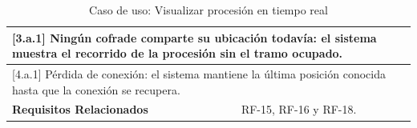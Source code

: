 \begin{table}[h!]
\begin{tabular}{|p{4cm}|p{11cm}|}
        \hline
        \multicolumn{2}{|p{15cm}|}{ [3.a.1] Ningún cofrade comparte su ubicación todavía: el sistema muestra el recorrido de la procesión sin el tramo ocupado. } \\
        \hline
        \multicolumn{2}{|p{15cm}|}{ [4.a.1] Pérdida de conexión: el sistema mantiene la última posición conocida hasta que la conexión se recupera. } \\
        \hline
        \textbf{Requisitos Relacionados} & RF-15, RF-16 y RF-18. \\
        \hline
    \end{tabular}
    \caption{Caso de uso: Visualizar procesión en tiempo real}
\end{table}

\begin{table}[h!]
    \centering
    \renewcommand{\arraystretch}{1.5}


\end{table}
